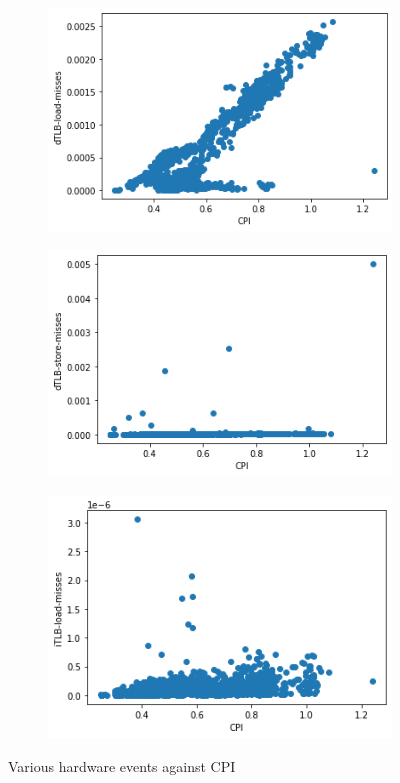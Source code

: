 \documentclass[10pt, letterpaper, IEEEtran, tikz,border=5,a4paper,fleqn]{article}
\begin{document}
\begin{figure}
\begin{subfigure}{.33\textwidth}
\end{subfigure}
\begin{subfigure}{.33\textwidth}
  \centering
  \includegraphics[width=.9\linewidth]{dTLB-load-misses.png}

\end{subfigure}%
\begin{subfigure}{.33\textwidth}
  \centering
  \includegraphics[width=.9\linewidth]{dTLB-store-misses.png}

\end{subfigure}%
\begin{subfigure}{.33\textwidth}
  \centering
  \includegraphics[width=.9\linewidth]{iTLB-load-misses.png}

\end{subfigure}
\caption{Various hardware events against CPI}
\label{fig:fig}
\end{figure}
\end{document}
